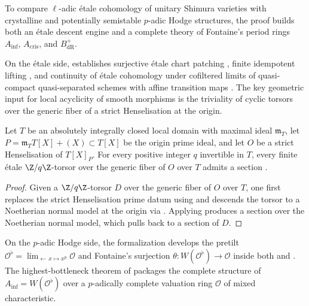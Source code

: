 To compare $\ell$-adic étale cohomology of unitary Shimura varieties with
crystalline and potentially semistable $p$-adic Hodge structures, the proof
builds both an étale descent engine and a complete theory of Fontaine's period
rings $A_{\mathrm{inf}}$, $A_{\mathrm{cris}}$, and $B_{\mathrm{dR}}^+$.

On the étale side,  establishes
surjective étale chart patching
, finite idempotent lifting
, and continuity of étale
cohomology under cofiltered limits of quasi-compact quasi-separated schemes
with affine transition maps .
The key geometric input for local acyclicity of smooth morphisms is the
triviality of cyclic torsors over the generic fiber of a strict Henselisation
at the origin.

\begin{theorem}
\label{thm:key-origin}
Let $T$ be an absolutely integrally closed local domain with maximal ideal
$\mathfrak{m}_T$, let $P = \mathfrak{m}_T T[X] + (X) \subset T[X]$ be the
origin prime ideal, and let $O$ be a strict Henselisation of $T[X]_P$. For
every positive integer $q$ invertible in $T$, every finite étale
$\Z/q\Z$-torsor over the generic fiber of $O$ over $T$ admits a section
.
\end{theorem}

\begin{proof}
Given a $\Z/q\Z$-torsor $D$ over the generic fiber of $O$ over $T$, one first
replaces the strict Henselisation prime datum using
 and descends the torsor
to a Noetherian normal model at the origin via
. Applying
produces a section over the Noetherian normal model, which pulls back to a
section of $D$.
\end{proof}

On the $p$-adic Hodge side, the formalization develops the pretilt
$\mathcal{O}^\flat = \lim_{\leftarrow\, x \mapsto x^p} \mathcal{O}$ and Fontaine's
surjection $\theta : W(\mathcal{O}^\flat) \to \mathcal{O}$ inside both
 and
. The highest-bottleneck theorem of
 packages the complete structure of
$A_{\mathrm{inf}} = W(\mathcal{O}^\flat)$ over a $p$-adically complete
valuation ring $\mathcal{O}$ of mixed characteristic.

